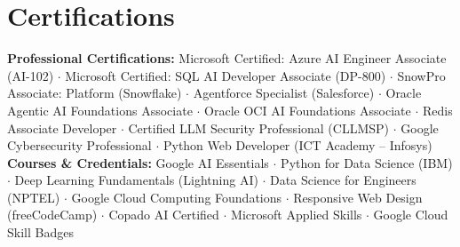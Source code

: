 \documentclass[a4paper,10pt]{article}
\begin{document}
\section{Certifications}
{\small
\textbf{Professional Certifications:} Microsoft Certified: Azure AI Engineer Associate (AI-102) $\cdot$ Microsoft Certified: SQL AI Developer Associate (DP-800) $\cdot$ SnowPro Associate: Platform (Snowflake) $\cdot$ Agentforce Specialist (Salesforce) $\cdot$ Oracle Agentic AI Foundations Associate $\cdot$ Oracle OCI AI Foundations Associate $\cdot$ Redis Associate Developer $\cdot$ Certified LLM Security Professional (CLLMSP) $\cdot$ Google Cybersecurity Professional $\cdot$ Python Web Developer (ICT Academy -- Infosys)\\[3pt]
\textbf{Courses \& Credentials:} Google AI Essentials $\cdot$ Python for Data Science (IBM) $\cdot$ Deep Learning Fundamentals (Lightning AI) $\cdot$ Data Science for Engineers (NPTEL) $\cdot$ Google Cloud Computing Foundations $\cdot$ Responsive Web Design (freeCodeCamp) $\cdot$ Copado AI Certified $\cdot$ Microsoft Applied Skills $\cdot$ Google Cloud Skill Badges}
\end{document}
